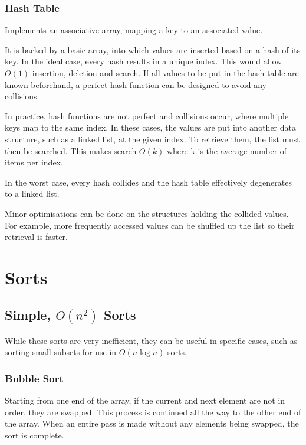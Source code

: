 \documentclass[]{article}
\begin{document}
\subsubsection{Hash Table}

Implements an associative array, mapping a key to an associated value.

It is backed by a basic array, into which values are inserted based on a hash of its key. In the ideal case, every hash results in a unique index. This would allow $O(1)$ insertion, deletion and search. If all values to be put in the hash table are known beforehand, a perfect hash function can be designed to avoid any collisions.

In practice, hash functions are not perfect and collisions occur, where multiple keys map to the same index. In these cases, the values are put into another data structure, such as a linked list, at the given index. To retrieve them, the list must then be searched. This makes search $O(k)$ where k is the average number of items per index.

In the worst case, every hash collides and the hash table effectively degenerates to a linked list.

Minor optimisations can be done on the structures holding the collided values. For example, more frequently accessed values can be shuffled up the list so their retrieval is faster.

\pagebreak

\section{Sorts}

\subsection{Simple, $O(n^2)$ Sorts}

While these sorts are very inefficient, they can be useful in specific cases, such as sorting small subsets for use in $O(n\log{n})$ sorts.

\subsubsection{Bubble Sort}

Starting from one end of the array, if the current and next element are not in order, they are swapped. This process is continued all the way to the other end of the array. When an entire pass is made without any elements being swapped, the sort is complete.
\end{document}
